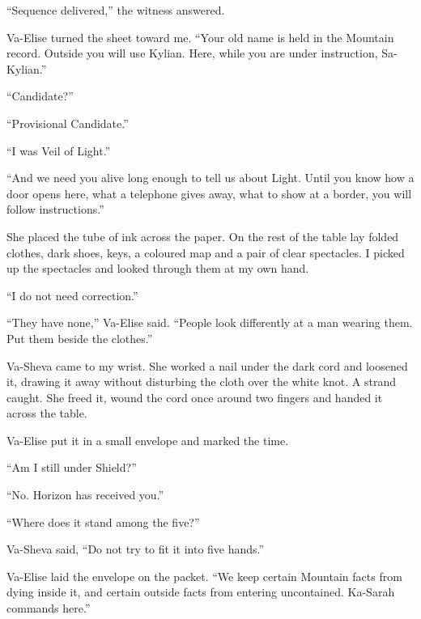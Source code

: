 ``Sequence delivered,'' the witness answered.\par

Va-Elise turned the sheet toward me. ``Your old name is held in the Mountain record. Outside you will use Kylian. Here, while you are under instruction, Sa-Kylian.''\par

``Candidate?''\par

``Provisional Candidate.''\par

``I was Veil of Light.''\par

``And we need you alive long enough to tell us about Light. Until you know how a door opens here, what a telephone gives away, what to show at a border, you will follow instructions.''\par

She placed the tube of ink across the paper. On the rest of the table lay folded clothes, dark shoes, keys, a coloured map and a pair of clear spectacles. I picked up the spectacles and looked through them at my own hand.\par

``I do not need correction.''\par

``They have none,'' Va-Elise said. ``People look differently at a man wearing them. Put them beside the clothes.''\par

Va-Sheva came to my wrist. She worked a nail under the dark cord and loosened it, drawing it away without disturbing the cloth over the white knot. A strand caught. She freed it, wound the cord once around two fingers and handed it across the table.\par

Va-Elise put it in a small envelope and marked the time.\par

``Am I still under Shield?''\par

``No. Horizon has received you.''\par

``Where does it stand among the five?''\par

Va-Sheva said, ``Do not try to fit it into five hands.''\par

Va-Elise laid the envelope on the packet. ``We keep certain Mountain facts from dying inside it, and certain outside facts from entering uncontained. Ka-Sarah commands here.''\par

